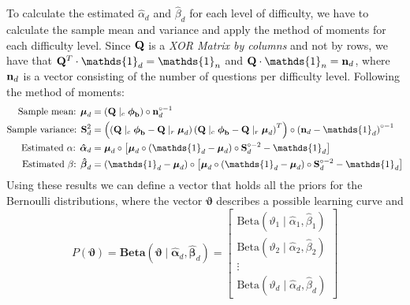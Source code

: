 \documentclass{article}
\newcommand{\0}{\mathbbold{0}}
\newcommand{\1}{\mathds{1}}
\newcommand{\Beta}[2]{\text{Beta}\!\left(#1,#2\right)}
\newcommand{\BBeta}[2]{\textbf{Beta}\!\left(#1,#2\right)}
\begin{document}
To calculate the estimated $\hat{\alpha}_d$ and $\hat{\beta}_d$ for each level of difficulty, we have to calculate the sample mean and variance and apply the method of moments for each difficulty level.
Since ${\bf Q}$ is a \textsl{XOR Matrix by columns} and not by rows, we have that ${\bf Q}^T \cdot \1_d = \1_n$ and ${\bf Q} \cdot \1_n = {\bf n}_d$, where ${\bf n}_d$ is a vector consisting of the number of questions per difficulty level.
Following the method of moments:
\begin{align*}
    \text{Sample mean: }{\boldsymbol \mu}_d &= \left( {\bf Q} \mid_c {\boldsymbol \phi}_{\bf b} \right) \circ {\bf n}_d^{\circ -1} \\
    \text{Sample variance: }{\bf S}_d^2 &= \left( \left({\bf Q} \mid_c {\boldsymbol \phi}_{\bf b} - {\bf Q} \mid_r {\boldsymbol \mu}_d\right)\left({\bf Q} \mid_c {\boldsymbol \phi}_{\bf b} - {\bf Q} \mid_r {\boldsymbol \mu}_d\right)^T \right) \circ \left( {\bf n}_d - \1_d \right)^{\circ -1} \\
    \text{Estimated }\alpha\text{: }\boldsymbol{\hat{\alpha}}_d &= {\boldsymbol \mu}_d \circ \left[ {\boldsymbol \mu}_d \circ \left( \1_d - {\boldsymbol \mu}_d \right) \circ {\bf S}_d^{\circ -2} - \1_d \right] \\
    \text{Estimated }\beta\text{: }\boldsymbol{\hat{\beta}}_d &= \left( \1_d - {\boldsymbol \mu}_d \right) \circ \left[ {\boldsymbol \mu}_d \circ \left( \1_d - {\boldsymbol \mu}_d \right) \circ {\bf S}_d^{\circ -2} - \1_d \right]
\end{align*}
Using these results we can define a vector that holds all the priors for the Bernoulli distributions, where the vector $\boldsymbol{\vartheta}$ describes a possible learning curve and
$$P({\boldsymbol \vartheta}) = \BBeta{\boldsymbol{\vartheta} \mid \boldsymbol{\hat{\alpha}}_d}{\boldsymbol{\hat{\beta}}_d} = \begin{bmatrix}
    \Beta{\vartheta_1 \mid \hat{\alpha}_1}{\hat{\beta}_1} \\
    \Beta{\vartheta_2 \mid \hat{\alpha}_2}{\hat{\beta}_2} \\
    \vdots \\
    \Beta{\vartheta_d \mid \hat{\alpha}_d}{\hat{\beta}_d}
\end{bmatrix} $$
\end{document}
